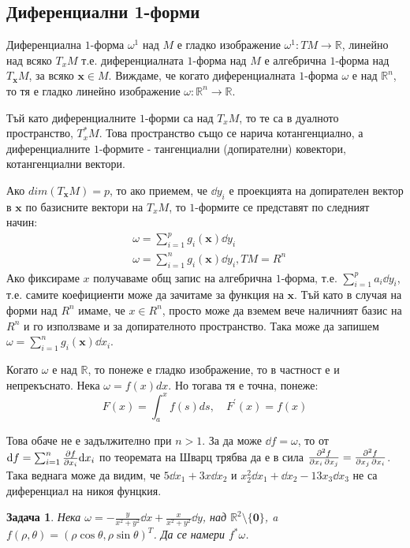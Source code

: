 \documentclass[12pt]{article}
\newtheorem{problem}{Задача}
\newcommand\func[3]{#1:#2 \to #3}
\newcommand\stfunc[1]{\func{#1}{\mathbb{R}^n}{\mathbb{R}}}
\begin{document}
\begin{large}
\subsection{Диференциални 1-форми}
Диференциална $1$-форма $\omega^1$ над $M$ е гладко изображение $\func{\omega^1}{TM}{\mathbb{R}}$, линейно над всяко $T_xM$ т.е. диференциалната $1$-форма над $M$ е алгебрична $1$-форма над $T_{\mathbf{x}}M$, за всяко ${\mathbf{x}} \in M$.
Виждаме, че когато диференциалната $1$-форма $\omega$ е над $\mathbb{R}^n$, то тя е гладко линейно изображение $\stfunc{\omega}$.

Тъй като диференциалните $1$-форми са над $T_x M$, то те са в дуалното пространство, $T_x^* M$. Това пространство също се нарича котангенциално, а диференциалните $1$-формите - тангенциални (допирателни) ковектори, котангенциални вектори.

Ако $dim(T_{\mathbf{x}}M)=p$, то ако приемем, че $\dd y_i$ е проекцията на допирателен вектор в ${\mathbf{x}}$ по базисните вектори на $T_xM$, то $1$-формите се представят по следният начин:
\begin{align*}
  &\omega = \sum_{i=1}^{p}g_i(\mathbf{x}) \dd y_i \\
  &\omega = \sum_{i=1}^{n}g_i(\mathbf{x}) \dd y_i, TM=R^n
\end{align*}
Ако фиксираме $x$ получаваме общ запис на алгебрична $1$-форма, т.е. $\sum_{i=1}^{p}a_i \dd y_i$, т.е. самите коефициенти може да зачитаме за функция на ${\mathbf{x}}$. Тъй като в случая на форми над $R^n$ имаме, че $x \in R^n$, просто може да вземем вече наличният базис на $R^n$ и го използваме и за допирателното пространство. Така може да запишем $\omega = \sum_{i=1}^{n}g_i(\mathbf{x}) \dd x_i$.

Когато $\omega$ е над $\mathbb{R}$, то понеже е гладко изображение, то в частност е и непрекъснато. Нека $\omega=f(x)dx$. Но тогава тя е точна, понеже:
\[
  F(x)=\int_{a}^{x}f(s)ds,\quad F^\prime(x)=f(x)
\]

Това обаче не е задължително при $n>1$. За да може $\dd f=\omega$, то от $\dd f= \sum_{i=1}^{n}\pdv{f}{x_i}\dd x_i$ по теоремата на Шварц трябва да е в сила $\pdv{f}{x_i,x_j}=\pdv{f}{x_j,x_i}$. Така веднага може да видим, че $5\dd x_1 + 3x \dd x_2$ и $x_2^2 \dd x_1 + \dd x_2 - 13x_3 \dd x_3$ не са диференциал на никоя фунцкия.

\begin{problem}
  Нека $\omega = - \frac{y}{x^2+y^2} \dd x + \frac{x}{x^2+y^2} \dd y$, над $\mathbb{R}^2 \setminus \{\mathbf{0}\}$, a $f(\rho,\theta)=(\rho \cos \theta,\rho \sin \theta)^T$. Да се намери $f^* \omega$.
\end{problem}


\end{large}
\end{document}
